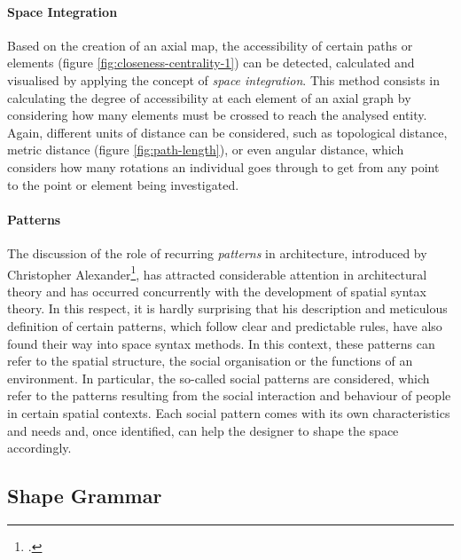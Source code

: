 \documentclass[a4paper, 12pt]{report}
\begin{document}
\paragraph{Space Integration}\label{par:space-integration}

Based on the creation of an \gls{axial map}, the accessibility of certain paths or elements (figure \ref{fig:closeness-centrality-1}) can be detected, calculated and visualised by applying the concept of \textit{space integration}. This method consists in calculating the degree of accessibility at each element of an axial graph by considering how many elements must be crossed to reach the analysed entity. Again, different units of distance can be considered, such as topological distance, metric distance (figure \ref{fig:path-length}), or even angular distance, which considers how many rotations an individual goes through to get from any point to the point or element being investigated.

\paragraph{Patterns}\label{par:patterns}

The discussion of the role of recurring \textit{patterns} in architecture, introduced by Christopher Alexander\footcite{alexander1977pattern}, has attracted considerable attention in architectural theory and has occurred concurrently with the development of spatial syntax theory. In this respect, it is hardly surprising that his description and meticulous definition of certain patterns, which follow clear and predictable rules, have also found their way into space syntax methods. In this context, these patterns can refer to the spatial structure, the social organisation or the functions of an environment. In particular, the so-called social patterns are considered, which refer to the patterns resulting from the social interaction and behaviour of people in certain spatial contexts. Each social pattern comes with its own characteristics and needs and, once identified, can help the designer to shape the space accordingly.

\subsection{Shape Grammar}\label{subsec:shape-grammar}
\end{document}
